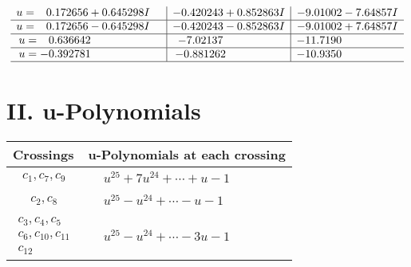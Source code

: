 \documentclass[1p]{elsarticle_modified}
\theoremstyle{definition}
\begin{document}
$$\begin{array}{c|c|c}
\begin{aligned}
u &= \phantom{-}0.172656 + 0.645298 I\end{aligned}
 & -0.420243 + 0.852863 I & -9.01002 - 7.64857 I \\ \hline\begin{aligned}
u &= \phantom{-}0.172656 - 0.645298 I\end{aligned}
 & -0.420243 - 0.852863 I & -9.01002 + 7.64857 I \\ \hline\begin{aligned}
u &= \phantom{-}0.636642\phantom{ +0.000000I}\end{aligned}
 & -7.02137\phantom{ +0.000000I} & -11.7190\phantom{ +0.000000I} \\ \hline\begin{aligned}
u &= -0.392781\phantom{ +0.000000I}\end{aligned}
 & -0.881262\phantom{ +0.000000I} & -10.9350\phantom{ +0.000000I}\\
 \hline 
 \end{array}$$\newpage
\newpage\renewcommand{\arraystretch}{1}
\centering \section*{ II. u-Polynomials}
\begin{tabular}{m{50pt}|m{274pt}}
Crossings & \hspace{64pt}u-Polynomials at each crossing \\
\hline $$\begin{aligned}c_{1},c_{7},c_{9}\end{aligned}$$&$\begin{aligned}
&u^{25}+7 u^{24}+\cdots+u-1
\end{aligned}$\\
\hline $$\begin{aligned}c_{2},c_{8}\end{aligned}$$&$\begin{aligned}
&u^{25}- u^{24}+\cdots- u-1
\end{aligned}$\\
\hline $$\begin{aligned}c_{3},c_{4},c_{5}\\c_{6},c_{10},c_{11}\\c_{12}\end{aligned}$$&$\begin{aligned}
&u^{25}- u^{24}+\cdots-3 u-1
\end{aligned}$\\
\hline
\end{tabular}\newpage\renewcommand{\arraystretch}{1}
\end{document}
